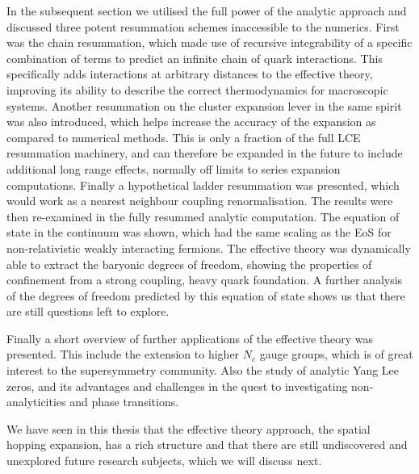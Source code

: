 In the subsequent section we utilised the full power of the analytic approach
and discussed three potent resummation schemes inaccessible to the numerics.
First was the chain resummation, which made use of recursive integrability of a
specific combination of terms to predict an infinite chain of quark
interactions. This specifically adds interactions at arbitrary distances to the
effective theory, improving its ability to describe the correct thermodynamics
for macroscopic systems. Another resummation on the cluster expansion lever in
the same spirit was also introduced, which helps increase the accuracy of the
expansion as compared to numerical methods. This is only a fraction of the full
LCE resummation machinery, and can therefore be expanded in the future to
include additional long range effects, normally off limits to series expansion
computations. Finally a hypothetical ladder resummation was presented, which
would work as a nearest neighbour coupling renormalisation. The results were
then re-examined in the fully resummed analytic computation. The equation of
state in the continuum was shown, which had the same scaling as the EoS for
non-relativistic weakly interacting fermions. The effective theory was
dynamically able to extract the baryonic degrees of freedom, showing the
properties of confinement from a strong coupling, heavy quark foundation. A
further analysis of the degrees of freedom predicted by this equation of state
shows us that there are still questions left to explore.

Finally a short overview of further applications of the effective theory was
presented. This include the extension to higher $N_c$ gauge groups, which is of
great interest to the supersymmetry community. Also the study of analytic Yang
Lee zeros, and its advantages and challenges in the quest to investigating
non-analyticities and phase transitions.

We have seen in this thesis that the effective theory approach, the spatial
hopping expansion, has a rich structure and that there are still undiscovered
and unexplored future research subjects, which we will discuss next.
